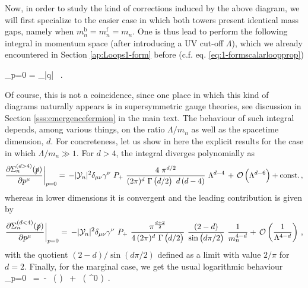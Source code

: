 		
Now, in order to study the kind of corrections induced by the above diagram, we will first specialize to the easier case in which both towers present identical mass gaps, namely when $m_n^{{\text{b}}} = m_n^{{\text{f}}} = m_n$. One is thus lead to perform the following integral in momentum space (after introducing a UV cut-off $\Lambda$), which we already encountered in Section \ref{ap:Loops1-form} before (c.f. eq. \eqref{eq:1-formscalarloopprop})
%
\beq\label{eq:momentumintegralfermionsamemasses}
		\begin{aligned}
			 \bigg\rvert_{p=0} =  \int_{|q| \leq \Lambda}   \, .
		\end{aligned}
\eeq
%
Of course, this is not a coincidence, since one place in which this kind of diagrams naturally appears is in supersymmetric gauge theories, see discussion in Section \ref{sss:emergencefermion} in the main text. The behaviour of such integral depends, among various things, on the ratio $\Lambda/m_n$ as well as the spacetime dimension, $d$. For concreteness, let us show in here the explicit results for the case in which $\Lambda/m_n \gg 1$. For $d>4$, the integral diverges polynomially as 
%
\begin{equation}
			\frac{\partial \Sigma_n^{(d>4)}(\slashed{p})}{\partial p^{\mu}} \bigg\rvert_{p=0} = \, -|\mathcal{Y}_n|^2 \delta_{\mu \nu} \gamma^{\nu}\ P_{+}\  \frac{4\ \pi^{d/2}}{(2 \pi)^d\ \Gamma\left( d/2 \right) \ d\, (d-4)}    \ \Lambda^{d-4} \, + \, \mathcal{O}\left(\Lambda^{d-6}\right) + \mathrm{const.}\, ,
\label{eq:fermionloopd>4}
\end{equation}
%
whereas in lower dimensions it is convergent and the leading contribution is given by
%
\begin{equation}
			\frac{\partial \Sigma_n^{(d<4)}(\slashed{p})}{\partial p^{\mu}} \bigg\rvert_{p=0} = \, - |\mathcal{Y}_n|^2 \delta_{\mu \nu} \gamma^{\nu}\ P_{+} \ \frac{\pi^{\frac{d+2}{2}} }{4 \, (2 \pi)^d  \ \Gamma\left( d/2 \right)} \ \frac{(2-d)}{\sin\left( d \pi/2\right)} \ \frac{1}{m_n^{4-d}} + \, \mathcal{O}\left(\frac{1}{\Lambda^{4-d}}\right)\, ,
\label{eq:fermionloopd<4}
\end{equation}
%
with the quotient $(2-d)/\sin\left( d \pi/2\right)$ defined as a limit with value $2/ \pi$ for $d=2$. Finally, for the marginal case, we get the usual logarithmic behaviour
%
\beq
		 \bigg\rvert_{p=0} \, =\, -  \, \log \left(  \right) \ + \ \left( \Lambda^0 \right)\, .
\label{eq:fermionloopd=4}
\eeq
%
		
